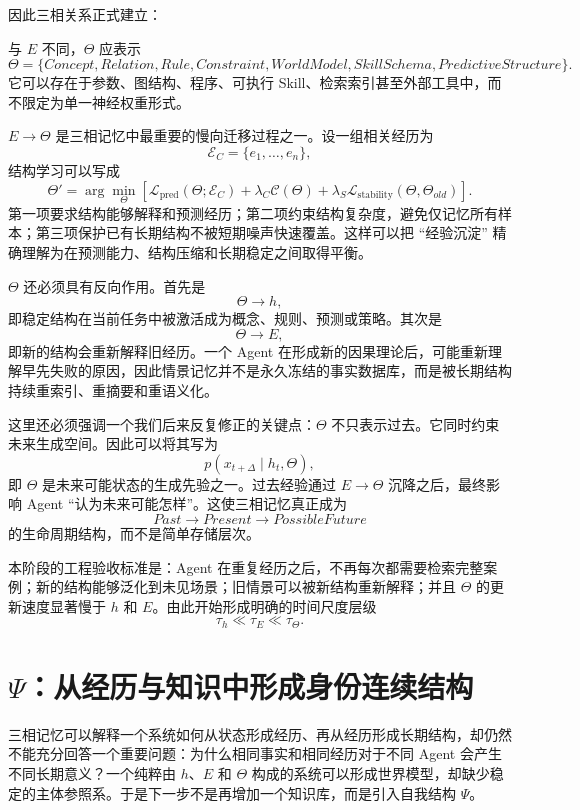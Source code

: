 因此三相关系正式建立：
\begin{statementbox}
\centering
{}
\end{statementbox}
与 $E$ 不同，$\Theta$ 应表示
\[
\Theta
=
\{
Concept,
Relation,
Rule,
Constraint,
WorldModel,
SkillSchema,
PredictiveStructure
\}.
\]
它可以存在于参数、图结构、程序、可执行 Skill、检索索引甚至外部工具中，而不限定为单一神经权重形式。

$E\rightarrow\Theta$ 是三相记忆中最重要的慢向迁移过程之一。设一组相关经历为
\[
\mathcal E_C
=
\{e_1,\ldots,e_n\},
\]
结构学习可以写成
\[
\Theta'
=
\arg\min_{\Theta}
\left[
\mathcal L_{\mathrm{pred}}(\Theta;\mathcal E_C)
+
\lambda_C\mathcal C(\Theta)
+
\lambda_S\mathcal L_{\mathrm{stability}}(\Theta,\Theta_{old})
\right].
\]
第一项要求结构能够解释和预测经历；第二项约束结构复杂度，避免仅记忆所有样本；第三项保护已有长期结构不被短期噪声快速覆盖。这样可以把 ``经验沉淀'' 精确理解为在预测能力、结构压缩和长期稳定之间取得平衡。

$\Theta$ 还必须具有反向作用。首先是
\[
\Theta\rightarrow h,
\]
即稳定结构在当前任务中被激活成为概念、规则、预测或策略。其次是
\[
\Theta\rightarrow E,
\]
即新的结构会重新解释旧经历。一个 Agent 在形成新的因果理论后，可能重新理解早先失败的原因，因此情景记忆并不是永久冻结的事实数据库，而是被长期结构持续重索引、重摘要和重语义化。

这里还必须强调一个我们后来反复修正的关键点：$\Theta$ 不只表示过去。它同时约束未来生成空间。因此可以将其写为
\[
p(x_{t+\Delta}\mid h_t,\Theta),
\]
即 $\Theta$ 是未来可能状态的生成先验之一。过去经验通过 $E\rightarrow\Theta$ 沉降之后，最终影响 Agent ``认为未来可能怎样''。这使三相记忆真正成为
\[
Past\rightarrow Present\rightarrow PossibleFuture
\]
的生命周期结构，而不是简单存储层次。

本阶段的工程验收标准是：Agent 在重复经历之后，不再每次都需要检索完整案例；新的结构能够泛化到未见场景；旧情景可以被新结构重新解释；并且 $\Theta$ 的更新速度显著慢于 $h$ 和 $E$。由此开始形成明确的时间尺度层级
\[
\tau_h\ll\tau_E\ll\tau_\Theta.
\]

\section{$\Psi$：从经历与知识中形成身份连续结构}

三相记忆可以解释一个系统如何从状态形成经历、再从经历形成长期结构，却仍然不能充分回答一个重要问题：为什么相同事实和相同经历对于不同 Agent 会产生不同长期意义？一个纯粹由 $h$、$E$ 和 $\Theta$ 构成的系统可以形成世界模型，却缺少稳定的主体参照系。于是下一步不是再增加一个知识库，而是引入自我结构 $\Psi$。

